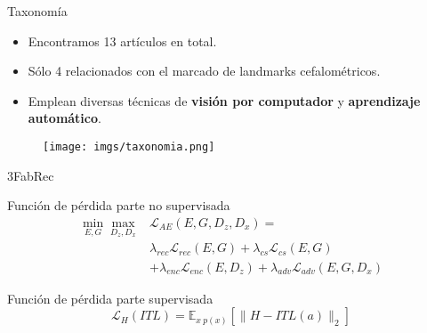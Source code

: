\documentclass[aspectratio=43]{beamer}
\renewcommand{\cite}[1]{\footnote<.->[frame]{\fullcite{#1}}}
\begin{document}

\begin{frame}[t]{Taxonomía}
  \begin{itemize}
    \item Encontramos 13 artículos en total.
    \item Sólo 4 relacionados con el marcado de landmarks cefalométricos.
    \item Emplean diversas técnicas de \textbf{visión por computador} y \textbf{aprendizaje automático}.
  \end{itemize}
  \begin{figure}
    \centering
    \texttt{[image: imgs/taxonomia.png]}
  \end{figure}
\end{frame}

\begin{frame}{3FabRec}
  \begin{block}{Función de pérdida parte no supervisada}
    \begin{align*}
      \min_{E,G} \max_{D_z,D_x} & \mathcal{L}_{AE}(E,G,D_z,D_x) = \\
      & \lambda_{rec} \mathcal{L}_{rec}(E,G) + \lambda_{cs}\mathcal{L}_{cs}(E,G) \\
      & + \lambda_{enc}\mathcal{L}_{enc}(E,D_z)+ \lambda_{adv} \mathcal{L}_{adv}(E,G,D_x)
    \end{align*}
  \end{block}
  \begin{block}{Función de pérdida parte supervisada}
    \begin{equation*}
      \mathcal{L}_H(ITL) = \mathbb{E}_{x ~ p(x)} \left[ \| H-ITL(a)\|_2 \right]
    \end{equation*}
  \end{block}
\end{frame}
\end{document}
